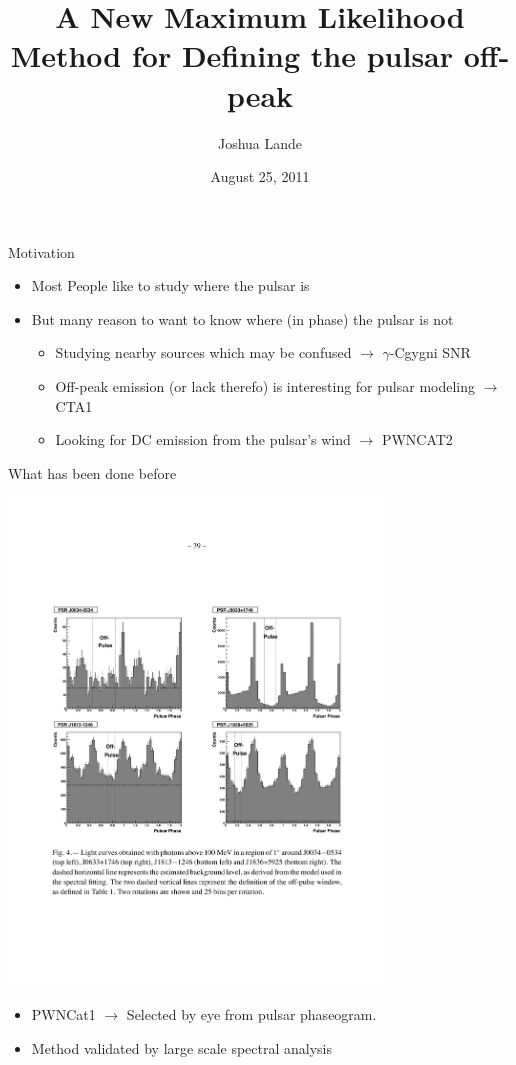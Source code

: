 \documentclass[12pt]{beamer}
\title{A New Maximum Likelihood Method for Defining the pulsar off-peak}
\author{Joshua Lande}
\institute{
With much help from Damien + Matthew\\[1em]
SLAC/Stanford}
\date{August 25, 2011}
\begin{document}
\fermititle

\begin{frame}{Motivation}
  \begin{itemize}
    \item Most People like to study where the pulsar is
    \item But many reason to want to know where (in phase) the pulsar is not
      \begin{itemize}
        \item Studying nearby sources which may be confused $\rightarrow$ $\gamma$-Cgygni SNR
        \item Off-peak emission (or lack therefo) is interesting for pulsar modeling  $\rightarrow$ CTA1
        \item Looking for DC emission from the pulsar's wind $\rightarrow$ PWNCAT2
      \end{itemize}
  \end{itemize}
\end{frame}

\begin{frame}{What has been done before}

  \includegraphics[width=0.75\textwidth]{plots/off_pulse_pwncat1.pdf}

  \begin{itemize}
    \item PWNCat1 $\rightarrow$ Selected by eye from pulsar phaseogram.
    \item Method validated by large scale spectral analysis
  \end{itemize}
\end{frame}
\end{document}
